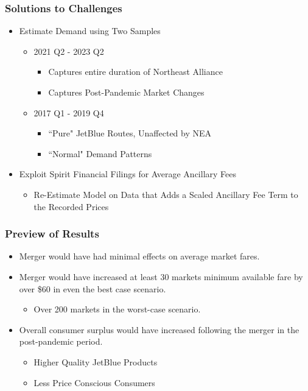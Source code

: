 \documentclass[xcolor=dvipsnames]{beamer}
\begin{document}
    \begin{frame}
        \frametitle{Solutions to Challenges}
        \begin{itemize}
            \item Estimate Demand using Two Samples
            \begin{itemize}
                \item 2021 Q2 - 2023 Q2
                \begin{itemize}
                    \item Captures entire duration of Northeast Alliance
                    \item Captures Post-Pandemic Market Changes
                \end{itemize}
                \item 2017 Q1 - 2019 Q4
                \begin{itemize}
                    \item ``Pure" JetBlue Routes, Unaffected by NEA
                    \item ``Normal" Demand Patterns
                \end{itemize}
            \end{itemize}
            \item Exploit Spirit Financial Filings for Average Ancillary Fees
            \begin{itemize}
                \item Re-Estimate Model on Data that Adds a Scaled Ancillary Fee Term to the Recorded Prices
            \end{itemize}
        \end{itemize}
    \end{frame}

    \begin{frame}
        \frametitle{Preview of Results}
        \begin{itemize}
            \item Merger would have had minimal effects on average market fares.
            \item Merger would have increased at least 30 markets minimum available fare by over \$60 in even the best case scenario. 
            \begin{itemize}
                \item Over 200 markets in the worst-case scenario. 
            \end{itemize}
            \item Overall consumer surplus would have increased following the merger in the post-pandemic period.
            \begin{itemize}
                \item Higher Quality JetBlue Products
                \item Less Price Conscious Consumers
            \end{itemize}
        \end{itemize}
    \end{frame}
\end{document}
